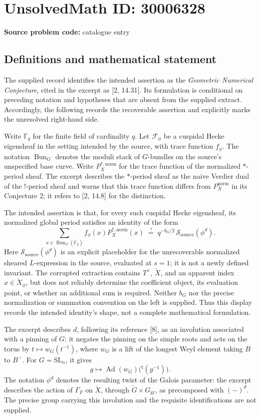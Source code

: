 \documentclass[11pt]{article}
\newcommand{\F}{\mathbb{F}}
\begin{document}
\section*{UnsolvedMath ID: 30006328}
\textbf{Source problem code:} catalogue entry
\subsection{Definitions and mathematical statement}
The supplied record identifies the intended assertion as the \emph{Geometric Numerical Conjecture}, cited in the excerpt as [2, 14.31]. Its formulation is conditional on preceding notation and hypotheses that are absent from the supplied extract. Accordingly, the following records the recoverable assertion and explicitly marks the unresolved right-hand side.

Write \(\F_q\) for the finite field of cardinality \(q\). Let \(\mathcal F_\phi\) be a cuspidal Hecke eigensheaf in the setting intended by the source, with trace function \(f_\phi\). The notation \(\operatorname{Bun}_G\) denotes the moduli stack of \(G\)-bundles on the source's unspecified base curve. Write \(P_X^{*,\mathrm{norm}}\) for the trace function of the normalized \(*\)-period sheaf. The excerpt describes the \(*\)-period sheaf as the naive Verdier dual of the \(!\)-period sheaf and warns that this trace function differs from \(P_X^{\mathrm{norm}}\) in its Conjecture 2; it refers to [2, 14.8] for the distinction.

The intended assertion is that, for every such cuspidal Hecke eigensheaf, its normalized global period satisfies an identity of the form
\[
 \sum_{x\in\operatorname{Bun}_G(\F_q)}
 f_\phi(x)P_X^{*,\mathrm{norm}}(x)
 \;\stackrel{?}{=}\;
 q^{-b_G/2}\,\mathcal S_{\mathrm{source}}(\phi^d).
\]
Here \(\mathcal S_{\mathrm{source}}(\phi^d)\) is an explicit placeholder for the unrecoverable normalized sheared \(L\)-expression in the source, evaluated at \(s=1\); it is not a newly defined invariant. The corrupted extraction contains \(T^\vee\), \(\check X\), and an apparent index \(x\in\check X_\phi\), but does not reliably determine the coefficient object, its evaluation point, or whether an additional sum is required. Neither \(b_G\) nor the precise normalization or summation convention on the left is supplied. Thus this display records the intended identity's shape, not a complete mathematical formulation.

The excerpt describes \(d\), following its reference [8], as an involution associated with a pinning of \(G\): it negates the pinning on the simple roots and acts on the torus by \(t\mapsto w_G(t^{-1})\), where \(w_G\) is a lift of the longest Weyl element taking \(B\) to \(B^-\). For \(G=\mathrm{SL}_n\), it gives
\[
 g\longmapsto\operatorname{Ad}(w_G)\bigl({}^{\mathsf t}(g^{-1})\bigr).
\]
The notation \(\phi^d\) denotes the resulting twist of the Galois parameter: the excerpt describes the action of \(\Gamma_F\) on \(\check X\), through \(\check G\times G_{\mathrm{gr}}\), as precomposed with \((-)^d\). The precise group carrying this involution and the requisite identifications are not supplied.
\end{document}

